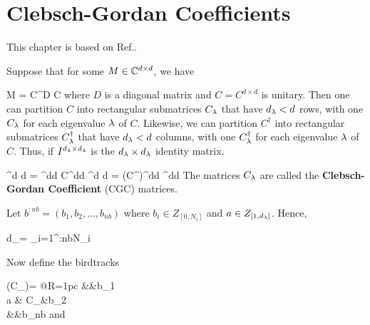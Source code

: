\chapter{Clebsch-Gordan Coefficients}
\label{ch-clebsch-gordan}
This chapter is based on Ref.\cite{birdtracks-book}.

Suppose that for some $M\in{ \mathbb{C}}^{d\times d}$, we have

\beq
M = C^\dagger D C
\eeq
where $D$ is a diagonal matrix and $C=C^{d\times d}$ is unitary.
Then one can partition 
$C$ into rectangular submatrices $C_\lambda$ that have $d_\lambda < d$ rows, 
with one $C_\lambda$
for each eigenvalue $\lambda$ of $C$.
Likewise, we can partition 
$C^\dagger$ into rectangular submatrices $C_\lambda^\dagger$ that have $d_\lambda < d$ columns, with one $C^\dagger_\lambda$
for each eigenvalue $\lambda$ of $C$. Thus, if $I^{d_\lambda\times d_\lambda}$
is the $d_\lambda\times d_\lambda$
identity matrix,

\beq
{}^{d \times d}
=
^{d\times d}
C^{d\times d}
\eeq
\beq
{}^{d \times d}
=
(C^\dagger)^{d\times d}
^{d\times d}
\eeq
The matrices $C_\lambda$
are called the {\bf Clebsch-Gordan Coefficient} (CGC) matrices.



Let $b^{:nb}=(b_1, b_2, \ldots, b_{nb})$ where $b_i\in Z_{[0,N_i]}$  and $a\in Z_{[1,d_\lambda]}$.
Hence,

\beq
d_\lam = \prod_{i=1}^{:nb}N_i
\eeq

Now define the birdtracks


\beq
(C_\lam)=
\bcen
\xymatrix@C=1pc@R=1pc{
&&b_1\ar[dl]
\\
a
& C_\lam\ar[l]
&b_2\ar[l]
\\
&&b_{nb}\ar[lu]
}
\ecen
\eeq
and



